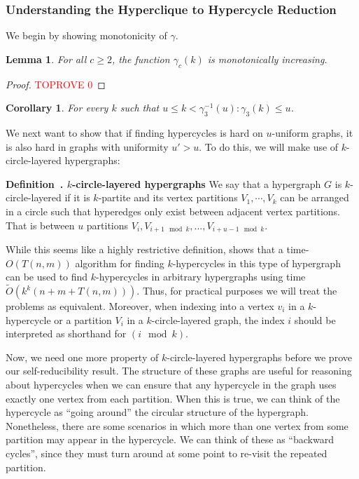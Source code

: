 \documentclass[11pt,letterpaper,pdftex]{article}
\newtheorem{lemma}[theorem]{Lemma}
\newtheorem{corollary}[theorem]{Corollary}
\newcounter{definition}
\newenvironment{definition}[1][]{\refstepcounter{definition}\par\medskip
   \noindent \textbf{Definition~\thedefinition. #1} \rmfamily}{\medskip}
\begin{document}
\subsubsection{Understanding the Hyperclique to Hypercycle Reduction}

We begin by showing monotonicity of $\gamma$.

\begin{lemma} \label{lem:gamma monotone}
    For all $c\geq2$, the function $\gamma_c(k)$ is monotonically increasing.
\end{lemma}
\begin{proof}\textcolor{red}{TOPROVE 0}\end{proof}

\begin{corollary}
For every $k$ such that $u\leq k<\gamma_3^{-1}(u):\gamma_3(k) \leq u$.
\end{corollary}

We next want to show that if finding hypercycles is hard on $u$-uniform graphs, it is also hard in graphs with uniformity $u'>u$. 
To do this, we will make use of $k$-circle-layered hypergraphs:

\begin{definition}[$k$-circle-layered hypergraphs]
    We say that a hypergraph $G$ is $k$-circle-layered if it is $k$-partite and its vertex partitions $V_1, \cdots, V_k$ can be arranged in a circle such that hyperedges only exist between adjacent vertex partitions. That is between $u$ partitions $V_i, V_{i+1 \mod k},...,V_{i+u-1 \mod k}$. 
\end{definition}

While this seems like a highly restrictive definition, \cite[Lemma~2.2]{LVW18} shows that a time-$O(T(n,m))$ algorithm for finding $k$-hypercycles in this type of hypergraph can be used to find $k$-hypercycles in arbitrary hypergraphs using time $\tilde{O}(k^k(n+m+T(n,m)))$.
Thus, for practical purposes we will treat the problems as equivalent.
Moreover, when indexing into a vertex $v_i$ in a $k$-hypercycle or a partition $V_i$ in a $k$-circle-layered graph, the index $i$ should be interpreted as shorthand for $(i \mod{k})$.



Now, we need one more property of $k$-circle-layered hypergraphs before we prove our self-reducibility result.
The structure of these graphs are useful for reasoning about hypercycles when we can ensure that any hypercycle in the graph uses exactly one vertex from each partition.
When this is true, we can think of the hypercycle as ``going around'' the circular structure of the hypergraph.
Nonetheless, there are some scenarios in which more than one vertex from some partition may appear in the hypercycle.
We can think of these as ``backward cycles'', since they must turn around at some point to re-visit the repeated partition.
\end{document}
